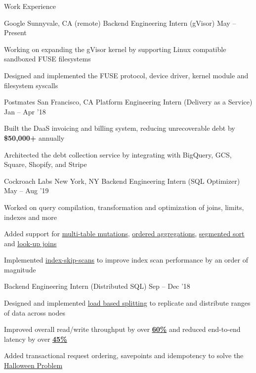\documentclass{resume} %
\begin{document}
\begin{rSection}{Work Experience}
  \begin{rWorkSection}{Google}
		     {Sunnyvale, CA (remote)}
		     {Backend Engineering Intern (gVisor)}
		     {May -- Present}
    {
      \item Working on expanding the gVisor kernel by supporting Linux
        compatible sandboxed FUSE filesystems 
      \item Designed and implemented the
        FUSE protocol, device driver, kernel module and filesystem syscalls
    }
  \end{rWorkSection}
  \begin{rWorkSection}{Postmates}
		     {San Francisco, CA}
		     {Platform Engineering Intern (Delivery as a Service)}
		     {Jan -- Apr '18}
    {
      \item Built the DaaS invoicing and
        billing system, reducing unrecoverable debt by \textbf{\$50,000+} annually
      \item Architected the debt collection service by integrating with
        BigQuery, GCS, Square, Shopify, and Stripe
    }
  \end{rWorkSection}
  \begin{rDualWorkSection}{Cockroach Labs}
         {New York, NY}
         {Backend Engineering Intern (SQL Optimizer)}
         {May -- Aug '19}
    {
       \item Worked on query compilation, transformation and
         optimization of joins, limits, indexes and more
       \item Added support for  
         \href{https://github.com/cockroachdb/cockroach/pull/38452}{\ul{multi-table
           mutations}}, 
         \href{https://github.com/cockroachdb/cockroach/pull/38452}{\underline{ordered
           aggregations}}, 
         \href{https://github.com/cockroachdb/cockroach/pull/38452}{\underline{segmented
             sort}} and 
         \href{https://github.com/cockroachdb/cockroach/pull/38285}{\underline{look-up
           joins}}
       \item Implemented
         \href{https://github.com/cockroachdb/cockroach/pull/39668}{\ul{index-skip-scans}}
         to improve index scan performance by an order of magnitude
    }
    {Backend Engineering Intern (Distributed SQL)}
    {Sep -- Dec '18}
    {
       \item Designed and implemented \href{https://github.com/cockroachdb/cockroach/pull/31413}
      {\underline{load based splitting}} to replicate
      and distribute ranges of data across nodes
    \item Improved overall read/write throughput by over
         \setul{4pt}{.4pt}
         \href{https://github.com/cockroachdb/cockroach/issues/31819}{\textbf{\ul{60\%}}}
         and reduced end-to-end latency by over
         \href{https://github.com/cockroachdb/cockroach/issues/31819}{\textbf{\ul{45\%}}}
       \item Added transactional request
           ordering, savepoints and idempotency to solve the 
         \setul{4pt}{.4pt}
         \href{https://github.com/cockroachdb/cockroach/pull/33244}{\ul{Halloween
             Problem}}
    }
  \end{rDualWorkSection}


\end{rSection}
\end{document}
